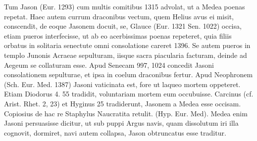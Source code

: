 \documentclass[landscape, a4paper, 11pt, oneside, polutonikogreek, german]{article}
\begin{document}
Tum Jason (Eur. 1293) cum multis comitibus 1315 advolat, ut a Medea poenas repetat. Haec autem currum draconibus vectum, quem Helius avus ei misit, conscendit, de eoque Jasonem docuit, se, Glauce (Eur. 1321 Sen. 1022) occisa, etiam pueros interfecisse, ut ab eo acerbissimas poenas repeteret, quia filiis orbatus in solitaria senectute omni consolatione careret 1396. Se autem pueros in templo Junonis Acraeae sepulturam, iisque sacra piacularia facturam, deinde ad Aegeum se collaturam esse. Apud Senecam 997, 1024 concedit Jasoni consolationem sepulturae, et ipsa in coelum draconibus fertur. Apud Neophronem (Sch. Eur. Med. 1387) Jasoni vaticinata est, fore ut laqueo mortem oppeteret. Etiam Diodorus 4. 55 tradidit, voluntariam mortem eum occubuisse. Carcinus (cf. Arist. Rhet. 2, 23) et Hyginus 25 tradiderunt, Jasonem a Medea esse occisam. Copiosius de hac re Staphylus Naucratita retulit. (Hyp. Eur. Med). Medea enim Jasoni persuasisse dicitur, ut sub puppi Argus navis, quam dissolutum iri illa cognovit, dormiret, navi autem collapsa, Jason obtruncatus esse traditur.
\end{document}
